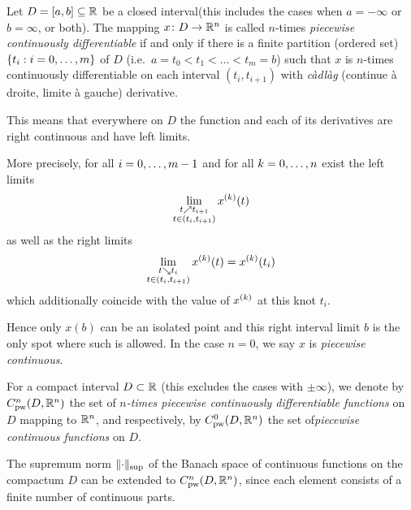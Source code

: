 
    \begin{definition}\label{def:pw-cont-diff}
        Let $D=[a,b]\subseteq\mathbb{R}$ be a closed interval(this includes the cases when $a=-\infty$ or $b=\infty$, or both). The mapping $x\colon D\to\mathbb{R}^n$ is called $n$-times \emph{piecewise continuously differentiable} if and only if there is a finite partition (ordered set) $\{t_i:i=0,\ldots,m\}$ of $D$ (i.e.\ $a=t_0<t_1<\ldots<t_m=b$) such that $x$ is $n$-times continuously differentiable on each interval $(t_i,t_{i+1})$ with \foreignlanguage{frenchb}{\emph{càdlàg} (\og continue à droite, limite à gauche\fg{})} derivative.

        This means that everywhere on $D$ the function and each of its derivatives are right continuous and have left limits.

        More precisely, for all $i=0,\ldots,m-1$ and for all $k=0,\ldots,n$ exist the left limits
        \begin{equation}
            \lim_{\substack{t\upto t_{i+1}\\ t\in(t_i,t_{i+1})}} \D[k]{x}(t)
        \end{equation}
        as well as the right limits
        \begin{equation}
            \lim_{\substack{t\downto t_{i}\\ t\in(t_i,t_{i+1})}} \D[k]{x}(t) = \D[k]{x}(t_i)
        \end{equation}
        which additionally coincide with the value of $\D[k]{x}$ at this knot $t_i$.

        Hence only $x(b)$ can be an isolated point and this right interval limit $b$ is the only spot where such is allowed.
        In the case $n=0$, we say $x$ is \emph{piecewise continuous}.

        For a compact interval $D\subset\mathbb{R}$ (this excludes the cases with $\pm\infty$), we denote by $\Cnpw[n]{D}{\R^n}$ the set of \emph{$n$-times piecewise continuously differentiable functions} on $D$ mapping to $\mathbb{R}^n$, and respectively, by $\Cnpw[0]{D}{\R^n}$ the set of\emph{piecewise continuous functions} on $D$.

        The supremum norm $\lVert\cdot\rVert_{\sup}$ of the Banach space of continuous functions on the compactum $D$ can be extended to $\Cnpw[n]{D}{\R^n}$, since each element consists of a finite number of continuous parts.
    \end{definition}

